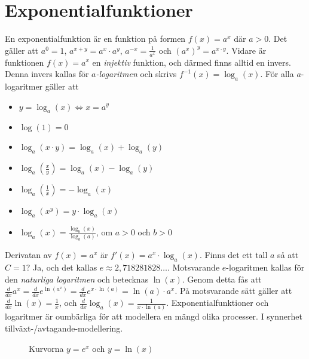 \section{Exponentialfunktioner}
En exponentialfunktion är en funktion på formen $f(x)=a^x$ där $a>0$.
Det gäller att $a^0=1$, $a^{x+y}=a^x\cdot a^y$, $a^{-x}=\frac{1}{a^x}$ och $(a^x)^y=a^{x\cdot y}$.
Vidare är funktionen $f(x)=a^x$ en \emph{injektiv} funktion, och därmed finns alltid en invers.
Denna invers kallas för \emph{$a$-logaritmen} och skrivs $f^{-1}(x)=\log_a(x)$.
För alla $a$-logaritmer gäller att
\begin{itemize}
    \item $y=\log_a(x) \Leftrightarrow x=a^y$
    \item $\log(1)=0$
    \item $\log_a(x\cdot y)=\log_a(x)+\log_a(y)$
    \item $\log_a(\frac{x}{y})=\log_a(x)-\log_a(y)$
    \item $\log_a(\frac{1}{x})=-\log_a(x)$
    \item $\log_a(x^y)=y\cdot \log_a(x)$
    \item $\log_a(x)=\frac{\log_b(x)}{\log_b(a)}$, om $a>0$ och $b>0$
\end{itemize}
Derivatan av $f(x)=a^x$ är $f'(x)=a^x\cdot \log_a(x)$.
Finns det ett tall $a$ så att $C=1$?
Ja, och det kallas $e\approx 2,718281828\ldots$.
Motsvarande $e$-logaritmen kallas för den \emph{naturliga logaritmen} och betecknas $\ln(x)$.
Genom detta fås att $\frac{d}{dx}a^x=\frac{d}{dx}e^{\ln(a^x)}=\frac{d}{dx}e^{x\cdot\ln(a)}=\ln(a)\cdot a^x$.
På motsvarande sätt gäller att $\frac{d}{dx}\ln(x)=\frac{1}{x}$, och $\frac{d}{dx}\log_a(x)=\frac{1}{x\cdot \ln(a)}$.
Exponentialfunktioner och logaritmer är oumbärliga för att modellera en mängd olika processer.
I synnerhet tillväxt-/avtagande-modellering.
\begin{figure}[h]
    \centering
    \caption{Kurvorna $y=e^x$ och $y=\ln(x)$}
\end{figure}
